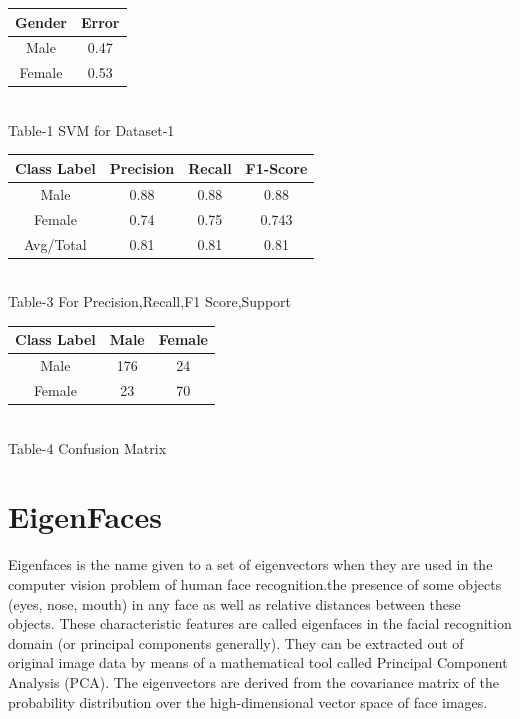 \documentclass[journal]{IEEEtran}
\begin{document}
	
\begin{center}
		\begin{tabular}{||c c ||} 
		\hline
		Gender & Error \\ 
		\hline\hline
		Male &   0.47\\ 
		\hline
		Female &   0.53\\
	\end{tabular}\\
	\small Table-1 SVM for Dataset-1
\vspace{0.5cm}\\
\begin{tabular}{||c c c c||} 
	\hline
	Class Label & Precision & Recall & F1-Score \\ 
	\hline\hline
	Male & 0.88 & 0.88 & 0.88 \\ 
	\hline
	Female & 0.74 & 0.75 & 0.743 \\ 
	\hline
	Avg/Total & 0.81 & 0.81 & 0.81 \\ 
	
\end{tabular}\\
	\small Table-3 For Precision,Recall,F1 Score,Support
		\vspace{0.5cm}
		
	\begin{tabular}{||c c c ||} 
		\hline
		Class Label & Male & Female \\ 
		\hline\hline
		Male & 176 & 24  \\ 
		\hline
		Female & 23 & 70  \\
	\end{tabular}\\
	\small Table-4 Confusion Matrix

\end{center}
\section{EigenFaces}
	Eigenfaces is the name given to a set of eigenvectors when they are used in the computer vision problem of human face recognition.the presence of some
	objects (eyes, nose, mouth) in any face as well as relative distances between
	these objects. These characteristic features are called eigenfaces in the facial
	recognition domain (or principal components generally). They can be extracted
	out of original image data by means of a mathematical tool called Principal
	Component Analysis (PCA).  The eigenvectors are derived from the covariance
	matrix of the probability distribution over the high-dimensional vector space of
	face images.	
	
\end{document}
